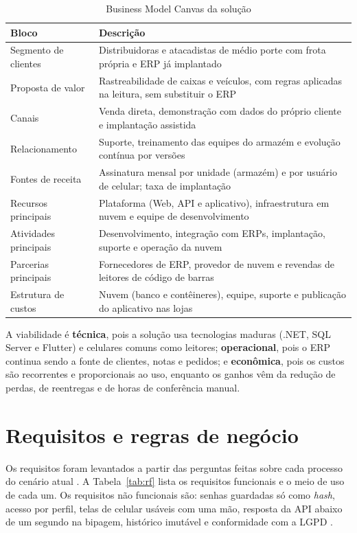 \begin{table}[htbp]
\centering
\caption{Business Model Canvas da solução}
\label{tab:canvas}
\small
\begin{tabular}{|p{3.6cm}|p{10.8cm}|}
\hline
\textbf{Bloco} & \textbf{Descrição} \\ \hline
Segmento de clientes & Distribuidoras e atacadistas de médio porte com frota própria e ERP já implantado \\ \hline
Proposta de valor & Rastreabilidade de caixas e veículos, com regras aplicadas na leitura, sem substituir o ERP \\ \hline
Canais & Venda direta, demonstração com dados do próprio cliente e implantação assistida \\ \hline
Relacionamento & Suporte, treinamento das equipes do armazém e evolução contínua por versões \\ \hline
Fontes de receita & Assinatura mensal por unidade (armazém) e por usuário de celular; taxa de implantação \\ \hline
Recursos principais & Plataforma (Web, API e aplicativo), infraestrutura em nuvem e equipe de desenvolvimento \\ \hline
Atividades principais & Desenvolvimento, integração com ERPs, implantação, suporte e operação da nuvem \\ \hline
Parcerias principais & Fornecedores de ERP, provedor de nuvem e revendas de leitores de código de barras \\ \hline
Estrutura de custos & Nuvem (banco e contêineres), equipe, suporte e publicação do aplicativo nas lojas \\ \hline
\end{tabular}
\end{table}

A viabilidade é \textbf{técnica}, pois a solução usa tecnologias maduras (.NET, SQL Server e Flutter) e celulares comuns como leitores; \textbf{operacional}, pois o ERP continua sendo a fonte de clientes, notas e pedidos; e \textbf{econômica}, pois os custos são recorrentes e proporcionais ao uso, enquanto os ganhos vêm da redução de perdas, de reentregas e de horas de conferência manual.

\section{Requisitos e regras de negócio}

Os requisitos foram levantados a partir das perguntas feitas sobre cada processo do cenário atual \cite{sommerville2018}. A Tabela~\ref{tab:rf} lista os requisitos funcionais e o meio de uso de cada um. Os requisitos não funcionais são: senhas guardadas só como \textit{hash}, acesso por perfil, telas de celular usáveis com uma mão, resposta da API abaixo de um segundo na bipagem, histórico imutável e conformidade com a LGPD \cite{brasil2018lgpd}.


